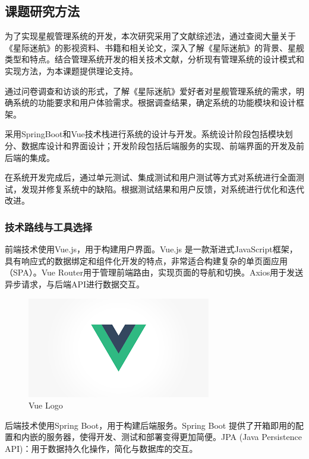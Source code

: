 \documentclass{base}
\begin{document}
\subsection{课题研究方法}

为了实现星舰管理系统的开发，本次研究采用了文献综述法，通过查阅大量关于《星际迷航》的影视资料、书籍和相关论文，深入了解《星际迷航》的背景、星舰类型和特点。结合管理系统开发的相关技术文献，分析现有管理系统的设计模式和实现方法，为本课题提供理论支持。

通过问卷调查和访谈的形式，了解《星际迷航》爱好者对星舰管理系统的需求，明确系统的功能要求和用户体验需求。根据调查结果，确定系统的功能模块和设计框架。

采用SpringBoot和Vue技术栈进行系统的设计与开发。系统设计阶段包括模块划分、数据库设计和界面设计；开发阶段包括后端服务的实现、前端界面的开发及前后端的集成。

在系统开发完成后，通过单元测试、集成测试和用户测试等方式对系统进行全面测试，发现并修复系统中的缺陷。根据测试结果和用户反馈，对系统进行优化和迭代改进。

\subsubsection{技术路线与工具选择}


前端技术使用Vue.js，用于构建用户界面。Vue.js 是一款渐进式JavaScript框架，具有响应式的数据绑定和组件化开发的特点，非常适合构建复杂的单页面应用（SPA）。Vue Router用于管理前端路由，实现页面的导航和切换。Axios用于发送异步请求，与后端API进行数据交互。

\begin{figure}[H]
	\centering
	\includegraphics[width=0.7\linewidth]{images/vue-logo.png}
	\caption{Vue Logo}
	\label{fig:}
\end{figure}

后端技术使用Spring Boot，用于构建后端服务。Spring Boot 提供了开箱即用的配置和内嵌的服务器，使得开发、测试和部署变得更加简便。JPA (Java Persistence API)：用于数据持久化操作，简化与数据库的交互。
\end{document}
